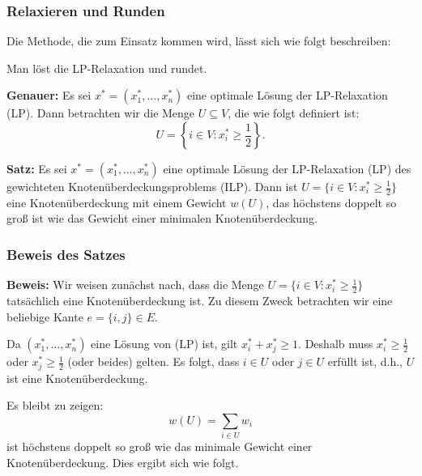 \documentclass[smaller]{beamer}
\begin{document}
\begin{frame}
\frametitle{Relaxieren und Runden}
Die Methode, die zum Einsatz kommen wird, lässt sich wie folgt beschreiben:

\begin{center}
\alert{Man löst die LP-Relaxation und rundet.}
\end{center}

\textbf{Genauer:} Es sei $x^* = (x_1^*,\ldots,x_n^*)$ eine optimale Lösung der LP-Relaxation (LP). Dann betrachten wir die Menge $U \subseteq V$, die wie folgt definiert ist:
\[
U = \left\{ i \in V : x_i^* \geq \frac{1}{2} \right\}.
\]

\textbf{Satz:} Es sei $x^* = (x_1^*,\ldots,x_n^*)$ eine optimale Lösung der LP-Relaxation (LP) des gewichteten Knotenüberdeckungsproblems (ILP). Dann ist $U = \big\{ i \in V : x_i^* \geq \frac{1}{2} \big\}$ eine Knotenüberdeckung mit einem Gewicht $w(U)$, das \alert{höchstens doppelt so groß} ist wie das Gewicht einer minimalen Knotenüberdeckung.
\end{frame}

\begin{frame}
\frametitle{Beweis des Satzes}
\textbf{Beweis:} Wir weisen zunächst nach, dass die Menge $U = \big\{ i \in V : x_i^* \geq \frac{1}{2} \big\}$ tatsächlich eine Knotenüberdeckung ist. Zu diesem Zweck betrachten wir eine beliebige Kante $e = \big\{ i,j \big\} \in E$. \\ \vspace*{0.2cm}

Da $(x_1^*, \ldots, x_n^*)$ eine Lösung von (LP) ist, gilt $x_i^* + x_j^* \geq 1$. Deshalb muss $x_i^* \geq \frac{1}{2}$ oder $x_j^* \geq \frac{1}{2}$ (oder beides) gelten. Es folgt, dass $i \in U$ oder $j \in U$ erfüllt ist, d.h., \alert{$U$ ist eine Knotenüberdeckung}. \\ \vspace*{0.2cm}

Es bleibt zu zeigen: $$w(U) = \sum_{i \in U}{w_i}$$ ist höchstens doppelt so groß wie das minimale Gewicht einer Knotenüberdeckung. Dies ergibt sich wie folgt.

\end{frame}
\end{document}
